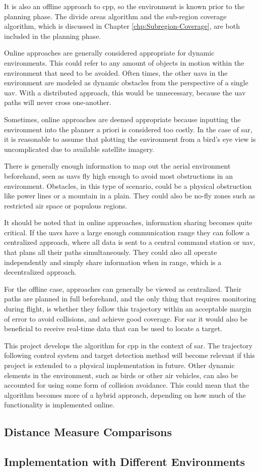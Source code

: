 It is also an offline approach to \ac{cpp}, so the environment is known prior to the planning phase. The divide areas algorithm and the sub-region coverage algorithm, which is discussed in Chapter \ref{chp:Subregion-Coverage}, are both included in the planning phase. 

Online approaches are generally considered appropriate for dynamic environments. This could refer to any amount of objects in motion within the environment that need to be avoided. Often times, the other \acp{uav} in the environment are modeled as dynamic obstacles from the perspective of a single \ac{uav}. With a distributed approach, this would be unnecessary, because the \ac{uav} paths will never cross one-another. 

Sometimes, online approaches are deemed appropriate because inputting the environment into the planner a priori is considered too costly. In the case of \ac{sar}, it is reasonable to assume that plotting the environment from a bird's eye view is uncomplicated due to available satellite imagery. 

There is generally enough information to map out the aerial environment beforehand, seen as \acp{uav} fly high enough to avoid most obstructions in an environment. Obstacles, in this type of scenario, could be a physical obstruction like power lines or a mountain in a plain. They could also be no-fly zones such as restricted air space or populous regions.

It should be noted that in online approaches, information sharing becomes quite critical. If the \acp{uav} have a large enough communication range they can follow a centralized approach, where all data is sent to a central command station or \ac{uav}, that plans all their paths simultaneously. They could also all operate independently and simply share information when in range, which is a decentralized approach. \cite{Zhang2020}

For the offline case, approaches can generally be viewed as centralized. Their paths are planned in full beforehand, and the only thing that requires monitoring during flight, is whether they follow this trajectory within an acceptable margin of error to avoid collisions, and achieve good coverage. For \ac{sar} it would also be beneficial to receive real-time data that can be used to locate a target.

This project develops the algorithm for \ac{cpp} in the context of \ac{sar}. The trajectory following control system and target detection method will become relevant if this project is extended to a physical implementation in future. Other dynamic elements in the environment, such as birds or other air vehicles, can also be accounted for using some form of collision avoidance. This could mean that the algorithm becomes more of a hybrid approach, depending on how much of the functionality is implemented online.

\subsection{Distance Measure Comparisons}
\label{sec:DARP dist}

\subsection{Implementation with Different Environments}
